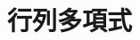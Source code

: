 \documentclass[../../topic_linear-algebra]{subfiles}
\begin{document}
\chapter{行列多項式}



\end{document}
